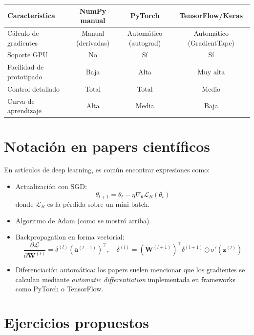 \documentclass[12pt,a4paper,openany,oneside]{book}
\begin{document}
\begin{center}
\begin{tabular}{lccc}
\toprule
\textbf{Característica} & \textbf{NumPy manual} & \textbf{PyTorch} & \textbf{TensorFlow/Keras} \\
\midrule
Cálculo de gradientes & Manual (derivadas) & Automático (autograd) & Automático (GradientTape) \\
Soporte GPU & No & Sí & Sí \\
Facilidad de prototipado & Baja & Alta & Muy alta \\
Control detallado & Total & Total & Medio \\
Curva de aprendizaje & Alta & Media & Baja \\
\bottomrule
\end{tabular}
\end{center}

\section{Notación en papers científicos}

En artículos de deep learning, es común encontrar expresiones como:

\begin{itemize}
    \item Actualización con SGD:
    \[
    \theta_{t+1} = \theta_t - \eta \nabla_{\theta} \mathcal{L}_B(\theta_t)
    \]
    donde $\mathcal{L}_B$ es la pérdida sobre un mini-batch.

    \item Algoritmo de Adam (como se mostró arriba).
    \item Backpropagation en forma vectorial:
    \[
    \frac{\partial \mathcal{L}}{\partial \mathbf{W}^{(l)}} = \delta^{(l)} (\mathbf{a}^{(l-1)})^\top, \quad \delta^{(l)} = (\mathbf{W}^{(l+1)})^\top \delta^{(l+1)} \odot \sigma'(\mathbf{z}^{(l)})
    \]
    \item Diferenciación automática: los papers suelen mencionar que los gradientes se calculan mediante \textit{automatic differentiation} implementada en frameworks como PyTorch o TensorFlow.
\end{itemize}

\section{Ejercicios propuestos}
\end{document}
